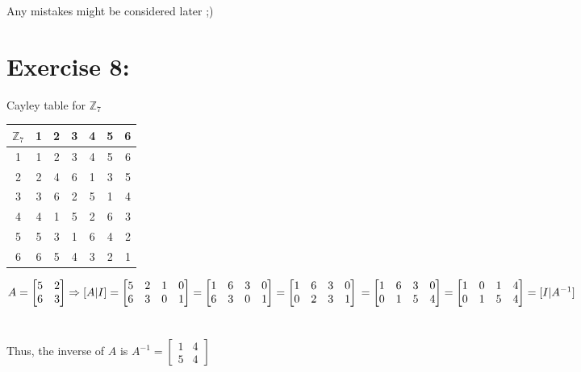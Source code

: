 \documentclass{article}
\newcommand{\Z}{\mathbb{Z}}
\begin{document}
			Any mistakes might be considered later ;)
	
	\section{Exercise 8:}
		Cayley table for $\Z_7$
	
		\centering
		\begin{tabular} {| c |c c c c c c |}
			\hline
			$\Z_7$ & 1 & 2 & 3 & 4 & 5 & 6\\
			\hline
			1 		  & 1 & 2 & 3 & 4 & 5 & 6\\
			2 		  & 2 & 4 & 6 & 1 & 3 & 5\\
			3 		  & 3 & 6 & 2 & 5 & 1 & 4\\
			4 		  & 4 & 1 & 5 & 2 & 6 & 3\\
			5 		  & 5 & 3 & 1 & 6 & 4 & 2\\
			6 		  & 6 & 5 & 4 & 3 & 2 & 1\\
			\hline
		\end{tabular}
		
		\justify
		\begin{math}
			A = \begin{bmatrix}
					5 & 2\\
					6 & 3
				\end{bmatrix}
			\Rightarrow
			[A|I] =	\begin{bmatrix}
				  		5 & 2 & 1 & 0\\
						6 & 3 & 0 & 1
			  		\end{bmatrix}
			  	  = \begin{bmatrix}
			  	  		1 & 6 & 3 & 0\\
			  	  		6 & 3 & 0 & 1
			  	  \end{bmatrix}
			  	  = \begin{bmatrix}
			  	  		1 & 6 & 3 & 0\\
			  	  		0 & 2 & 3 & 1
			  	  \end{bmatrix}
			  	  \\\\\\
			  	  = \begin{bmatrix}
					  	1 & 6 & 3 & 0\\
					  	0 & 1 & 5 & 4
			  	  \end{bmatrix}
			  	  = \begin{bmatrix}
				  	    1 & 0 & 1 & 4\\
						0 & 1 & 5 & 4\\					
			  	  \end{bmatrix}
			  	  = [I|A^{-1}]
		\end{math}\\\\\\
		Thus, the inverse of $A$ is $A^{-1} = \begin{bmatrix}
												 1 & 4\\
												 5 & 4	
											  \end{bmatrix}$
\end{document}
